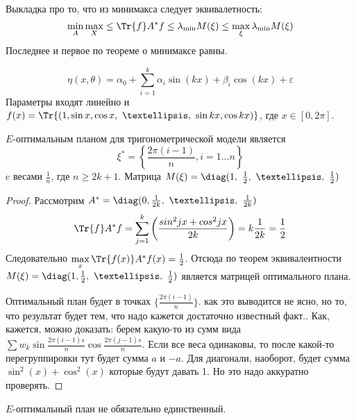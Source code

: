 Выкладка про то, что из минимакса следует эквивалетность:
$$ \min\limits_{A} \max\limits_{X} \leq \Tr{f}A^{*} f \leq \lambda_{\min}M(\xi) \leq \max\limits_{\xi}\lambda_{\min}M(\xi)$$
Последнее и первое по теореме о минимаксе равны.

$$ \eta(x, \theta) = \alpha_0 + \sum\limits_{i=1}^k \alpha_i \sin(kx) + \beta_i \cos(kx) + \varepsilon$$
Параметры входят линейно и $f(x) = \Tr{(1, \sin x, \cos x, …, \sin kx, \cos kx)}$, где $x \in [0, 2\pi]$.  

\begin{thm}
$E$-оптимальным планом для тригонометрической модели является 
$$ \xi^{*} = \left\{ \frac{2\pi(i-1)}{n}, i = 1…n\right\}$$
c весами $\frac{1}{n}$, где $n \geq 2k + 1$.
Матрица $M(\xi) = \diag(1, \frac{1}{2}, …, \frac{1}{2})$
\end{thm}
\begin{proof}
    Рассмотрим $A^{*}=\diag(0,\frac{1}{2k}, …, \frac{1}{2k})$
$$\Tr{f}A^*f = \sum\limits_{j=1}^k \left(\frac{sin^2 jx + cos^2jx}{2k}\right)= k \frac{1}{2k} = \frac{1}{2}$$
Следовательно $\max\limits_x \Tr{f(x)}A^{*}f(x) = \frac{1}{2}$. Отсюда по теорем эквивалентности $M(\xi) = \diag(1, \frac{1}{2}, …, \frac{1}{2})$ является матрицей оптимального плана. 

Оптимальный план будет в точках $\{ \frac{2\pi(i-1)}{n}\}$. {\color{blue} как это выводится не ясно, но то, что результат будет тем, что надо кажется достаточно известный факт.}. 
{\color{blue} Как, кажется, можно доказать: берем какую-то из сумм вида $\sum w_k \sin\frac{2\pi(i-1)s}{n} \cos\frac{2\pi(j-1)s}{n}$. Если все веса одинаковы, то после какой-то перегруппировки тут будет сумма $a$ и $-a$. Для диагонали, наоборот, будет сумма $\sin^2(x) + \cos^2(x)$ которые будут давать 1. Но это надо аккуратно проверять.} 
\end{proof}

\begin{note}
$E$-оптимальный план не обязательно единственный. 
\end{note}

